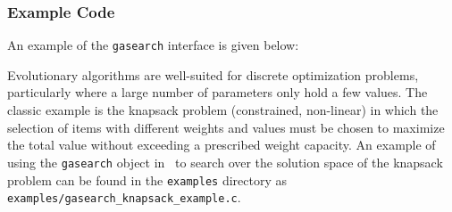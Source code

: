 \subsubsection{Example Code}
\label{module:optim:gasearch:example}
An example of the {\tt gasearch} interface is given below:
%

%
Evolutionary algorithms are well-suited for discrete optimization
problems, particularly where a large number of parameters only hold a
few values.
The classic example is the knapsack problem (constrained, non-linear)
in which the selection of items with different weights and values must
be chosen to maximize the total value without exceeding a prescribed
weight capacity.
An example of using the {\tt gasearch} object in \liquid\ to search
over the solution space of the knapsack problem can be found in the
{\tt examples} directory as
{\tt examples/gasearch\_knapsack\_example.c}.

